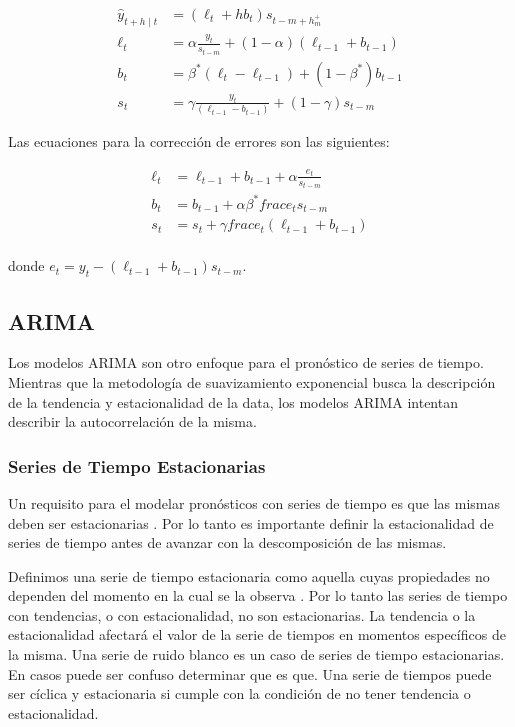 \begin{spacing}{1.5}
\begin{equation} 
\begin{split}
	\hat{y}_{t+h \mid t} & = (\ell_{t} + hb_{t}) s_{t-m+h_{m}^{+}} \\
 	\ell_{t} & = \alpha \frac{y_{t}}{s_{t-m}} + (1 - \alpha)(\ell_{t-1} + b_{t-1}) \\
    b_{t} & = \beta^{*}(\ell_{t} - \ell_{t-1}) + (1 - \beta^{*})b_{t-1} \\
    s_{t} & = \gamma \frac{y_{t}}{(\ell_{t-1} - b_{t-1})} + (1-\gamma)s_{t-m}
\end{split}
\end{equation}

Las ecuaciones para la corrección de errores son las siguientes:

\begin{equation}
\begin{split}
	\ell_{t} & = \ell_{t-1} + b_{t-1} + \alpha \frac{e_{t}}{s_{t-m}} \\
    b_{t} & = b_{t-1} + \alpha \beta^{*} frac{e_{t}}{s_{t-m}} \\
    s_{t} & = s_{t} + \gamma frac{e_{t}}{(\ell_{t-1} + b_{t-1})} \\
\end{split}
\end{equation}

donde $e_{t} = y_{t} - (\ell_{t-1} + b_{t-1})s_{t-m}$.

\subsection{ARIMA}
Los modelos ARIMA son otro enfoque para el pronóstico de series de tiempo. Mientras que la metodología de suavizamiento exponencial busca la descripción de la tendencia y estacionalidad de la data, los modelos ARIMA intentan describir la autocorrelación de la misma. 

\subsubsection{Series de Tiempo Estacionarias}
Un requisito para el modelar pronósticos con series de tiempo es que las mismas deben ser estacionarias \cite{srivastava}. Por lo tanto es importante definir la estacionalidad de series de tiempo antes de avanzar con la descomposición de las mismas. 

Definimos una serie de tiempo estacionaria como aquella cuyas propiedades no dependen del momento en la cual se la observa \cite{hyndman}. Por lo tanto las series de tiempo con tendencias, o con estacionalidad, no son estacionarias. La tendencia o la estacionalidad afectará el valor de la serie de tiempos en momentos específicos de la misma. Una serie de ruido blanco es un caso de series de tiempo estacionarias. En casos puede ser confuso determinar que es que. Una serie de tiempos puede ser cíclica y estacionaria si cumple con la condición de no tener tendencia o estacionalidad.


\end{spacing}
